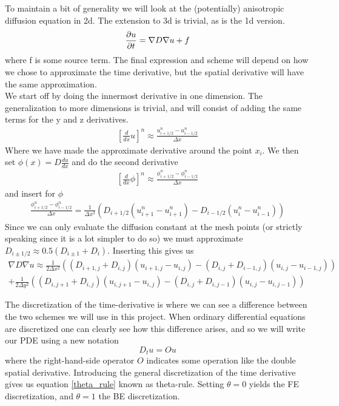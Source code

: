 To maintain a bit of generality we will look at the (potentially) anisotropic diffusion equation in 2d. The extension to 3d is trivial, as is the 1d version.
\begin{equation}
 \frac{\partial u}{\partial t} = \nabla D\nabla u +f
\end{equation}
where f is some source term. 
The final expression and scheme will depend on how we chose to approximate the time derivative, but the spatial derivative will have the same approximation. \\
We start off by doing the innermost derivative in one dimension. 
The generalization to more dimensions is trivial, and will consist of adding the same terms for the y and z derivatives. 
\begin{align*}
 \left[\frac{d}{dx}u\right]^n \approx \frac{u^n_{i+1/2}-u^n_{i-1/2}}{\Delta x}
\end{align*}
Where we have made the approximate derivative around the point $x_i$. 
We then set $\phi(x)=D\frac{du}{dx}$ and do the second derivative
\begin{align*}
  \left[\frac{d}{dx}\phi\right]^n \approx \frac{\phi^n_{i+1/2}-\phi^n_{i-1/2}}{\Delta x}
\end{align*}
and insert for $\phi$
\begin{align*}
 \frac{\phi^n_{i+1/2}-\phi^n_{i-1/2}}{\Delta x} = \frac{1}{\Delta x^2}\left(D_{i+1/2}(u^n_{i+1}-u^n_{i+1}) -D_{i-1/2}(u^n_{i}-u^n_{i-1})\right)
\end{align*}
Since we can only evaluate the diffusion constant at the mesh points (or strictly speaking since it is a lot simpler to do so) we must approximate $D_{i\pm1/2}\approx0.5(D_{i\pm1}+D_i)$. 
Inserting this gives us 
\begin{align*}
 \nabla D\nabla u\approx\frac{1}{2\Delta x^2}\left((D_{i+1,j}+D_{i,j})(u_{i+1,j}-u_{i,j})-(D_{i,j}+D_{i-1,j})(u_{i,j}-u_{i-1,j})\right) \\
 +\frac{1}{2\Delta y^2}\left((D_{i,j+1}+D_{i,j})(u_{i,j+1}-u_{i,j})-(D_{i,j}+D_{i,j-1})(u_{i,j}-u_{i,j-1})\right)
\end{align*}

The discretization of the time-derivative is where we can see a difference between the two schemes we will use in this project. 
When ordinary differential equations are discretized one can clearly see how this difference arises, and so we will write our PDE using a new notation
\begin{equation}
 D_t u = Ou
\end{equation}
where the right-hand-side operator $O$ indicates some operation like the double spatial derivative. 
Introducing the general discretization of the time derivative gives us equation \ref{theta_rule} known as theta-rule. 
Setting $\theta = 0$ yields the FE discretization, and $\theta = 1$ the BE discretization. 

